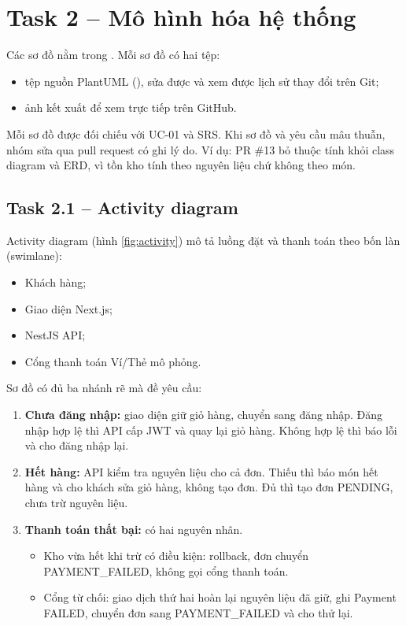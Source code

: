 \section{Task 2 -- Mô hình hóa hệ thống}\label{ch:mohinh}

Các sơ đồ nằm trong . Mỗi sơ đồ có hai tệp:
\begin{itemize}
\item tệp nguồn PlantUML (), sửa được và xem được lịch sử thay đổi trên Git;
\item ảnh kết xuất để xem trực tiếp trên GitHub.
\end{itemize}

Mỗi sơ đồ được đối chiếu với UC-01 và SRS. Khi sơ đồ và yêu cầu mâu thuẫn, nhóm sửa qua pull request có ghi lý do. Ví dụ: PR \#13 bỏ thuộc tính  khỏi class diagram và ERD, vì tồn kho tính theo nguyên liệu chứ không theo món.

\subsection{Task 2.1 -- Activity diagram}
Activity diagram (hình \ref{fig:activity}) mô tả luồng đặt và thanh toán theo bốn làn (swimlane):
\begin{itemize}
\item Khách hàng;
\item Giao diện Next.js;
\item NestJS API;
\item Cổng thanh toán Ví/Thẻ mô phỏng.
\end{itemize}

Sơ đồ có đủ ba nhánh rẽ mà đề yêu cầu:
\begin{enumerate}
\item \textbf{Chưa đăng nhập:} giao diện giữ giỏ hàng, chuyển sang đăng nhập. Đăng nhập hợp lệ thì API cấp JWT và quay lại giỏ hàng. Không hợp lệ thì báo lỗi và cho đăng nhập lại.
\item \textbf{Hết hàng:} API kiểm tra nguyên liệu cho cả đơn. Thiếu thì báo món hết hàng và cho khách sửa giỏ hàng, không tạo đơn. Đủ thì tạo đơn PENDING, chưa trừ nguyên liệu.
\item \textbf{Thanh toán thất bại:} có hai nguyên nhân.
  \begin{itemize}
  \item Kho vừa hết khi trừ có điều kiện: rollback, đơn chuyển PAYMENT\_FAILED, không gọi cổng thanh toán.
  \item Cổng từ chối: giao dịch thứ hai hoàn lại nguyên liệu đã giữ, ghi Payment FAILED, chuyển đơn sang PAYMENT\_FAILED và cho thử lại.
  \end{itemize}
\end{enumerate}

